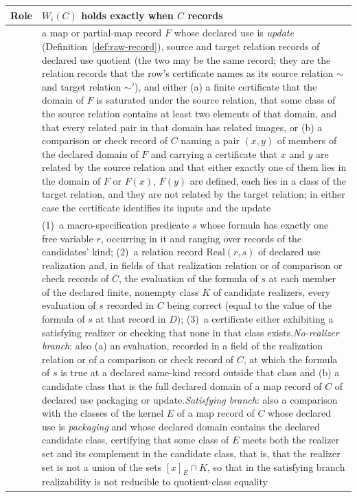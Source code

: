 \begin{center}
\small
\begin{tabularx}{\linewidth}{@{}l>{\raggedright\arraybackslash}X@{}}
\toprule
Role & \(W_i(C)\) holds exactly when \(C\) records \\
\midrule
\Pone{} & a map or partial-map record \(F\) whose declared use is \emph{update} (Definition~\ref{def:raw-record}), source and target relation records of declared use quotient (the two may be the same record; they are the relation records that the row's certificate names as its source relation \(\sim\) and target relation \(\sim'\)), and either (a) a finite certificate that the domain of \(F\) is saturated under the source relation, that some class of the source relation contains at least two elements of that domain, and that every related pair in that domain has related images, or (b) a comparison or check record of \(C\) naming a pair \((x,y)\) of members of the declared domain of \(F\) and carrying a certificate that \(x\) and \(y\) are related by the source relation and that either exactly one of them lies in the domain of \(F\) or \(F(x)\), \(F(y)\) are defined, each lies in a class of the target relation, and they are not related by the target relation; in either case the certificate identifies its inputs and the update \\
\Ptwo{} & (1)~a macro-specification predicate \(s\) whose formula has exactly one free variable \(r\), occurring in it and ranging over records of the candidates' kind; (2)~a relation record \(\mathrm{Real}(r,s)\) of declared use realization and, in fields of that realization relation or of comparison or check records of \(C\), the evaluation of the formula of \(s\) at each member of the declared finite, nonempty class \(K\) of candidate realizers, every evaluation of \(s\) recorded in \(C\) being correct (equal to the value of the formula of \(s\) at that record in \(D\)); (3)~a certificate either exhibiting a satisfying realizer or checking that none in that class exists.\newline \emph{No-realizer branch}: also (a) an evaluation, recorded in a field of the realization relation or of a comparison or check record of \(C\), at which the formula of \(s\) is true at a declared same-kind record outside that class and (b) a candidate class that is the full declared domain of a map record of \(C\) of declared use packaging or update.\newline \emph{Satisfying branch}: also a comparison with the classes of the kernel \(E\) of a map record of \(C\) whose declared use is \emph{packaging} and whose declared domain contains the declared candidate class, certifying that some class of \(E\) meets both the realizer set and its complement in the candidate class, that is, that the realizer set is not a union of the sets \([x]_E\cap K\), so that in the satisfying branch realizability is not reducible to quotient-class equality \\

\end{tabularx}
\end{center}

